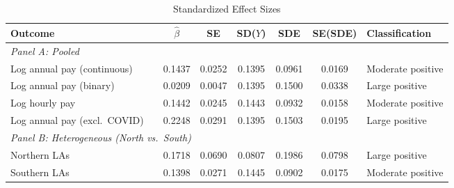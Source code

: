 \begin{table}[t]
\centering
\caption{Standardized Effect Sizes}
\label{tab:sde}
\begin{adjustbox}{max width=\textwidth}
\begin{tabular}{llcccccl}
\toprule
Outcome & & $\hat{\beta}$ & SE & SD($Y$) & SDE & SE(SDE) & Classification \\
\midrule
\multicolumn{8}{l}{\textit{Panel A: Pooled}} \\
Log annual pay (continuous) & & 0.1437 & 0.0252 & 0.1395 & 0.0961 & 0.0169 & Moderate positive \\
Log annual pay (binary) & & 0.0209 & 0.0047 & 0.1395 & 0.1500 & 0.0338 & Large positive \\
Log hourly pay & & 0.1442 & 0.0245 & 0.1443 & 0.0932 & 0.0158 & Moderate positive \\
Log annual pay (excl.\ COVID) & & 0.2248 & 0.0291 & 0.1395 & 0.1503 & 0.0195 & Large positive \\
\midrule
\multicolumn{8}{l}{\textit{Panel B: Heterogeneous (North vs.\ South)}} \\
Northern LAs & & 0.1718 & 0.0690 & 0.0807 & 0.1986 & 0.0798 & Large positive \\
Southern LAs & & 0.1398 & 0.0271 & 0.1445 & 0.0902 & 0.0175 & Moderate positive \\
\bottomrule
\end{tabular}
\end{adjustbox}
\par\vspace{0.3em}

\end{table}
